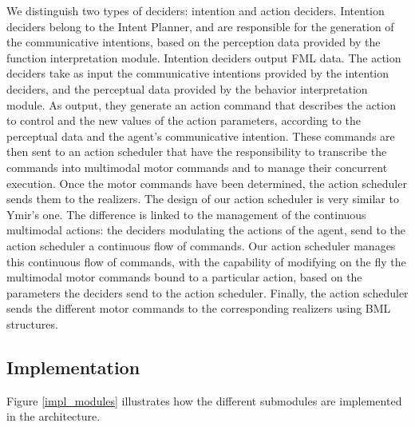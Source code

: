 We distinguish two types of deciders: intention and action deciders. 
Intention deciders belong to the Intent Planner, and are responsible for the generation of the communicative intentions, based on the perception data provided by the function interpretation module. Intention deciders output FML data. 
The action deciders take as input the communicative intentions provided by the intention deciders, and the perceptual data provided by the behavior interpretation module. As output, they generate an action command that describes the action to control and the new values of the action parameters, according to the perceptual data and the agent's communicative intention. 
These commands are then sent to an action scheduler that have the responsibility to transcribe the commands into multimodal motor commands and to manage their concurrent execution. Once the motor commands have been determined, the action scheduler sends them to the realizers. 
The design of our action scheduler is very similar to Ymir's one. The difference is linked to the management of the continuous multimodal actions: the deciders modulating the actions of the agent, send to the action scheduler a continuous flow of commands. Our action scheduler manages this continuous flow of commands, with the capability of modifying on the fly the multimodal motor commands bound to a particular action, based on the parameters the deciders send to the action scheduler. 
Finally, the action scheduler sends the different motor commands to the corresponding realizers using BML structures. 

\subsection{Implementation}


Figure \ref{impl_modules} illustrates how the different submodules are implemented in the architecture. 

